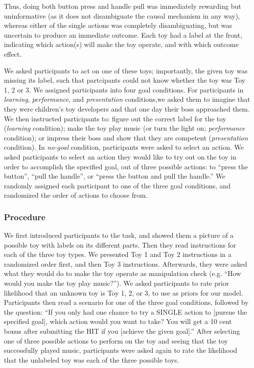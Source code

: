 \documentclass[10pt, letterpaper]{article}
\begin{document}
Thus, doing both button press and handle pull was immediately rewarding
but uninformative (as it does not disambiguate the causal mechanism in
any way), whereas either of the single actions was completely
disambiguating, but was uncertain to produce an immediate outcome. Each
toy had a label at the front, indicating which action(s) will make the
toy operate, and with which outcome effect.

We asked participants to act on one of these toys; importantly, the
given toy was missing its label, such that partcipants could not know
whether the toy was Toy 1, 2 or 3. We assigned participants into four
goal conditions. For participants in \emph{learning},
\emph{performance}, and \emph{presentation} conditions,we asked them to
imagine that they were children's toy developers and that one day their
boss approached them. We then instructed participants to: figure out the
correct label for the toy (\emph{learning} condition); make the toy play
music (or turn the light on; \emph{performance} condition); or impress
their boss and show that they are competent (\emph{presentation}
condition). In \emph{no-goal} condition, participants were asked to
select an action. We asked participants to select an action they would
like to try out on the toy in order to accomplish the specified goal,
out of three possible actions: to ``press the button'', ``pull the
handle'', or ``press the button and pull the handle.'' We randomly
assigned each participant to one of the three goal conditions, and
randomized the order of actions to choose from.

\subsubsection{Procedure}\label{procedure}

We first introduced participants to the task, and showed them a picture
of a possible toy with labels on its different parts. Then they read
instructions for each of the three toy types. We presented Toy 1 and Toy
2 instructions in a randomized order first, and then Toy 3 instructions.
Afterwards, they were asked what they would do to make the toy operate
as manipulation check (e.g. ``How would you make the toy play music?'').
We asked participants to rate prior likelihood that an unknown toy is
Toy 1, 2, or 3, to use as priors for our model. Participants then read a
scenario for one of the three goal conditions, followed by the question:
``If you only had one chance to try a SINGLE action to {[}pursue the
specified goal{]}, which action would you want to take? You will get a
10 cent bonus after submitting the HIT if you {[}achieve the given
goal{]}.'' After selecting one of three possible actions to perform on
the toy and seeing that the toy successfully played music, participants
were asked again to rate the likelihood that the unlabeled toy was each
of the three possible toys.
\end{document}
